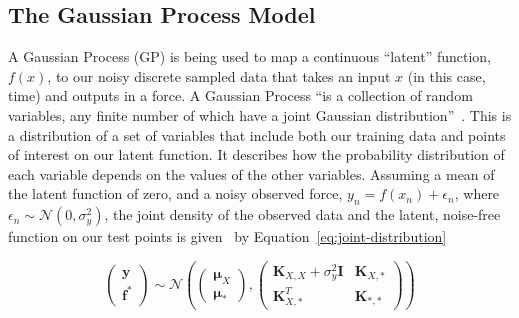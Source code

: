 \documentclass[12pt]{article}
\begin{document}
    \subsection{The Gaussian Process Model}
    A Gaussian Process (GP) is being used to map a continuous ``latent'' function, $f(x)$, to our noisy discrete sampled data that takes an input $x$ (in this case, time) and outputs in a force.
    A Gaussian Process ``is a collection of random variables, any finite number of which have a joint Gaussian distribution''~\cite{rasmussen2006gaussian}.
    This is a distribution of a set of variables that include both our training data and points of interest on our latent function.
    It describes how the probability distribution of each variable depends on the values of the other variables.
    Assuming a mean of the latent function of zero, and a noisy observed force, $y_n = f(x_n)+\epsilon_n$, where $\epsilon_n \sim \mathcal{N}(0, \sigma^2_y)$, the joint density of the observed data and the latent, noise-free function on our test points is given~\cite{murphy2023probabilistic} by Equation~\ref{eq:joint-distribution}

    \begin{equation}
        \begin{pmatrix}
            \mathbf{y} \\
            \mathbf{f}^*
        \end{pmatrix}
        \sim \mathcal{N} \left(
        \begin{pmatrix}
            \boldsymbol{\mu}_X \\
            \boldsymbol{\mu}_*
        \end{pmatrix},
        \begin{pmatrix}
            \mathbf{K}_{X,X} + \sigma^2_y \mathbf{I} & \mathbf{K}_{X,*} \\
            \mathbf{K}_{X,*}^T & \mathbf{K}_{*,*}
        \end{pmatrix}
        \right)\label{eq:joint-distribution}
    \end{equation}
\end{document}
